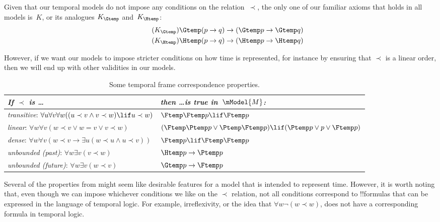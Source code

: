 \documentclass[../../../include/open-logic-section]{subfiles}
\begin{document}


Given that our temporal models do not impose any conditions on the
relation~$\prec$, the only one of our familiar axioms that holds in
all models is~$K$, or its analogues $K_{\Gtemp}$ and~$K_{\Htemp}$:
\begin{align*}
\tag{$K_{\Gtemp}$}  \Gtemp (p \to q) & \to (\Gtemp p \to \Gtemp q)\\
\tag{$K_{\Htemp}$}  \Htemp (p \to q) & \to (\Htemp p \to \Htemp q)
\end{align*}

However, if we want our models to impose stricter conditions on how
time is represented, for instance by ensuring that $\prec$ is a linear
order, then we will end up with other validities in our models.

\begin{table}[t]
  \begin{tabular}{| p{} || p{} |}
    \hline
    {\emph{If $\prec$ is \dots}} & {\emph{then \dots is true in~$\mModel{M}$:}} \\
    \hline \hline
    \emph{transitive}: \newline
    $\forall u \forall v \forall w ((u \prec v \land v \prec w) \lif u \prec w)$ & 
    $\Ftemp \Ftemp p \lif \Ftemp p$  \\
    \hline 
    \emph{linear}: \newline
    $\forall w \forall v (w \prec v \lor w = v \lor v \prec w)$ &  
    $(\Ftemp \Ptemp  p \lor \Ptemp \Ftemp p) \lif (\Ptemp p \lor p \lor \Ftemp p)$\\
    \hline
    \emph{dense}: \newline
    $\forall w \forall v (w \prec v \to \exists u(w \prec u \land u \prec v))$ &  
    $\Ftemp p \lif \Ftemp \Ftemp p$ \\
    \hline
    \emph{unbounded (past)}: \newline
    $\forall w \exists v( v \prec w)$ &  
    $\Htemp p \to \Ptemp p$ \\
    \hline
    \emph{unbounded (future)}: \newline
    $\forall w \exists v( w \prec v)$ &  
    $\Gtemp p \to \Ftemp p$ \\
    \hline
  \end{tabular}
  \caption{Some temporal frame correspondence properties.}
\end{table} 

Several of the properties from  might seem
like desirable features for a model that is intended to represent
time. However, it is worth noting that, even though we can impose
whichever conditions we like on the $\prec$ relation, not all
conditions correspond to !!{formula}s that can be expressed in the
language of temporal logic. For example, irreflexivity, or the idea
that $\forall w \lnot (w \prec w)$, does not have a corresponding
formula in temporal logic. 
\end{document}
